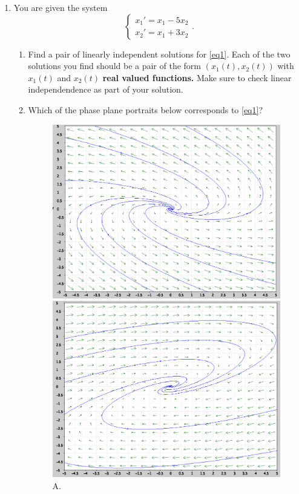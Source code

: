 \documentclass[11pt]{article}
\begin{document}
\begin{enumerate}
    \item You are given the system 
    \begin{equation}\label{eq1}
        \begin{cases}
            x_1'=x_1-5x_2\\
            x_2'=x_1+3x_2
        \end{cases}.
    \end{equation}
    \begin{enumerate}
        \item  Find a pair of linearly independent solutions for \eqref{eq1}.
        Each of the two solutions you find should be a pair of the form $(x_1(t),x_2(t))$ with $x_1(t)$ and $x_2(t)$ \textbf{real valued functions.} 
        Make sure to check linear independendence as part of your solution.
        \item Which of the phase plane portraits below corresponds to \eqref{eq1}?
        \begin{figure}[h]
              \includegraphics[width=\linewidth]{fig1}
              \caption{A.}
        \endminipage\hfill
              \includegraphics[width=\linewidth]{fig2}

\end{figure}
\end{enumerate}
\end{enumerate}
\end{document}
